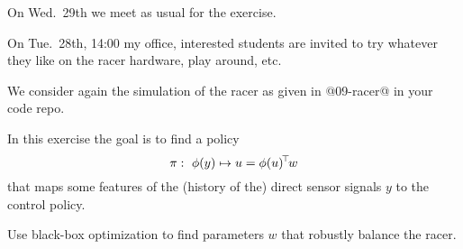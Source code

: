 

\renewcommand{\course}{Robotics}
\renewcommand{\coursepicture}{roboticsLecture}
\renewcommand{\coursedate}{Winter 2014}
\renewcommand{\exnum}{13}

\exercises


\exercisestitle


On Wed.\ 29th we meet as usual for the exercise.

On Tue.\ 28th, 14:00 my office, interested students are invited to try
whatever they like on the racer hardware, play around, etc.



We consider again the simulation of the racer as given in @09-racer@
in your code repo.

In this exercise the goal is to find a policy
$$\pi:~ \phi(y) \mapsto u = \phi(u)^{\!\top\!} w$$
that maps some features of the (history of the) direct sensor signals
$y$ to the control policy.

Use black-box optimization to find parameters $w$ that robustly
balance the racer.

